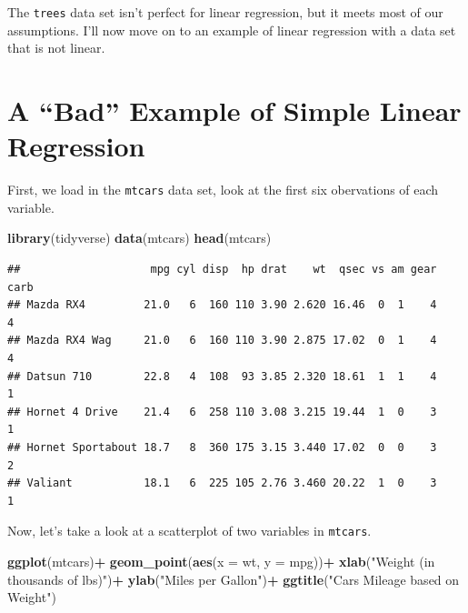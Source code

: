 \documentclass[
]{book}
\newenvironment{Shaded}{\begin{snugshade}}{\end{snugshade}}
\newcommand{\DataTypeTok}[1]{\textcolor[rgb]{0.13,0.29,0.53}{#1}}
\newcommand{\KeywordTok}[1]{\textcolor[rgb]{0.13,0.29,0.53}{\textbf{#1}}}
\newcommand{\NormalTok}[1]{#1}
\newcommand{\OperatorTok}[1]{\textcolor[rgb]{0.81,0.36,0.00}{\textbf{#1}}}
\newcommand{\StringTok}[1]{\textcolor[rgb]{0.31,0.60,0.02}{#1}}
\begin{document}
The \texttt{trees} data set isn't perfect for linear regression, but it meets most of our assumptions. I'll now move on to an example of linear regression with a data set that is not linear.

\hypertarget{a-bad-example-of-simple-linear-regression}{%
\section{A ``Bad'' Example of Simple Linear Regression}\label{a-bad-example-of-simple-linear-regression}}

First, we load in the \texttt{mtcars} data set, look at the first six obervations of each variable.

\begin{Shaded}
\begin{Highlighting}[]
\KeywordTok{library}\NormalTok{(tidyverse)}
\KeywordTok{data}\NormalTok{(mtcars)}
\KeywordTok{head}\NormalTok{(mtcars)}
\end{Highlighting}
\end{Shaded}

\begin{verbatim}
##                    mpg cyl disp  hp drat    wt  qsec vs am gear carb
## Mazda RX4         21.0   6  160 110 3.90 2.620 16.46  0  1    4    4
## Mazda RX4 Wag     21.0   6  160 110 3.90 2.875 17.02  0  1    4    4
## Datsun 710        22.8   4  108  93 3.85 2.320 18.61  1  1    4    1
## Hornet 4 Drive    21.4   6  258 110 3.08 3.215 19.44  1  0    3    1
## Hornet Sportabout 18.7   8  360 175 3.15 3.440 17.02  0  0    3    2
## Valiant           18.1   6  225 105 2.76 3.460 20.22  1  0    3    1
\end{verbatim}

Now, let's take a look at a scatterplot of two variables in \texttt{mtcars}.

\begin{Shaded}
\begin{Highlighting}[]
\KeywordTok{ggplot}\NormalTok{(mtcars)}\OperatorTok{+}
\StringTok{  }\KeywordTok{geom\_point}\NormalTok{(}\KeywordTok{aes}\NormalTok{(}\DataTypeTok{x =}\NormalTok{ wt, }\DataTypeTok{y =}\NormalTok{ mpg))}\OperatorTok{+}
\StringTok{  }\KeywordTok{xlab}\NormalTok{(}\StringTok{"Weight (in thousands of lbs)"}\NormalTok{)}\OperatorTok{+}
\StringTok{  }\KeywordTok{ylab}\NormalTok{(}\StringTok{"Miles per Gallon"}\NormalTok{)}\OperatorTok{+}
\StringTok{  }\KeywordTok{ggtitle}\NormalTok{(}\StringTok{"Car\textquotesingle{}s Mileage based on Weight"}\NormalTok{)}
\end{Highlighting}
\end{Shaded}
\end{document}
